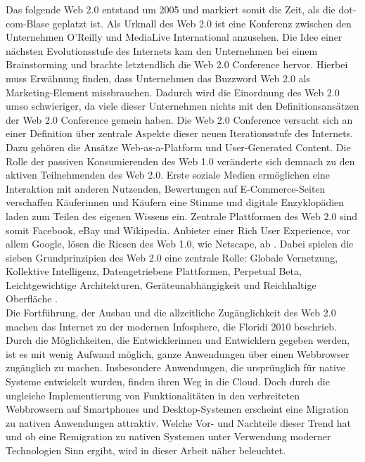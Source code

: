 \documentclass[a4paper]{scrartcl}
\begin{document}
Das folgende Web 2.0 entstand um 2005 und markiert somit die Zeit, als die dot-com-Blase geplatzt ist. Als Urknall des Web 2.0 ist eine Konferenz zwischen den Unternehmen O'Reilly und MediaLive International anzusehen. Die Idee einer nächsten Evolutionsstufe des Internets kam den Unternehmen bei einem Brainstorming und brachte letztendlich die Web 2.0 Conference hervor. Hierbei muss Erwähnung finden, dass Unternehmen das Buzzword Web 2.0 als Marketing-Element missbrauchen. Dadurch wird die Einordnung des Web 2.0 umso schwieriger, da viele dieser Unternehmen nichts mit den Definitionsansätzen der Web 2.0 Conference gemein haben. Die Web 2.0 Conference versucht sich an einer Definition über zentrale Aspekte dieser neuen Iterationsstufe des Internets. Dazu gehören die Ansätze Web-as-a-Platform und User-Generated Content. Die Rolle der passiven Konsumierenden des Web 1.0 veränderte sich demnach zu den aktiven Teilnehmenden des Web 2.0. Erste soziale Medien ermöglichen eine Interaktion mit anderen Nutzenden, Bewertungen auf E-Commerce-Seiten verschaffen Käuferinnen und Käufern eine Stimme und digitale Enzyklopädien laden zum Teilen des eigenen Wissens ein. Zentrale Plattformen des Web 2.0 sind somit Facebook, eBay und Wikipedia. Anbieter einer Rich User Experience, vor allem Google, lösen die Riesen des Web 1.0, wie Netscape, ab \autocite{Oreilly}. Dabei spielen die sieben Grundprinzipien des Web 2.0 eine zentrale Rolle: Globale Vernetzung, Kollektive Intelligenz, Datengetriebene Plattformen, Perpetual Beta, Leichtgewichtige Architekturen, Geräteunabhängigkeit und Reichhaltige Oberfläche \autocite[Kollmann und Häsel 2007, zitiert nach][137]{Kollmann}. \\

Die Fortführung, der Ausbau und die allzeitliche Zugänglichkeit des Web 2.0 machen das Internet zu der modernen Infosphere, die Floridi 2010 beschrieb. Durch die Möglichkeiten, die Entwicklerinnen und Entwicklern gegeben werden, ist es mit wenig Aufwand möglich, ganze Anwendungen über einen Webbrowser zugänglich zu machen. Insbesondere Anwendungen, die ursprünglich für native Systeme entwickelt wurden, finden ihren Weg in die Cloud. Doch durch die ungleiche Implementierung von Funktionalitäten in den verbreiteten Webbrowsern auf Smartphones und Desktop-Systemen erscheint eine Migration zu nativen Anwendungen attraktiv. Welche Vor- und Nachteile dieser Trend hat und ob eine Remigration zu nativen Systemen unter Verwendung moderner Technologien Sinn ergibt, wird in dieser Arbeit näher beleuchtet.
\end{document}

